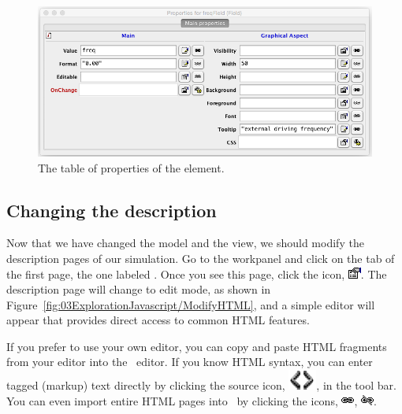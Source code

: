 \begin{figure}[htb]
    \centering
  \includegraphics[scale=\scale]{03ExplorationJavascript/images/ModifyField.png}
    \caption{The table of properties of the  element.}
    \label{fig:03ExplorationJavascript/ModifyField}
\end{figure}

\subsection{Changing the description}\label{section:03ExplorationJavascriptModifyingDescription}

Now that we have changed the model and the view, we should modify the description pages of our simulation. Go to the  workpanel and click on the tab of the first page, the one labeled . Once you see this page, click the  icon, \includegraphics[scale=\linescale]{../_common/icons_png/edit.png}. The description page will change to edit mode, as shown in Figure~\ref{fig:03ExplorationJavascript/ModifyHTML}, and a simple editor will appear that provides direct access to common HTML features.

If you prefer to use your own editor, you can copy and paste HTML fragments from your editor into the \ejs\ editor. If you know HTML syntax, you can enter tagged (markup) text directly by clicking the source icon, \includegraphics[scale=\linescale]{03ExplorationJavascript/images/SourceHK.png}, in the tool bar.  You can even import entire HTML pages into \ejs\ by clicking the  icons, \includegraphics[scale=\linescale]{../_common/icons_png/link.png}, \includegraphics[scale=\linescale]{../_common/icons_png/unlinked.png}.

